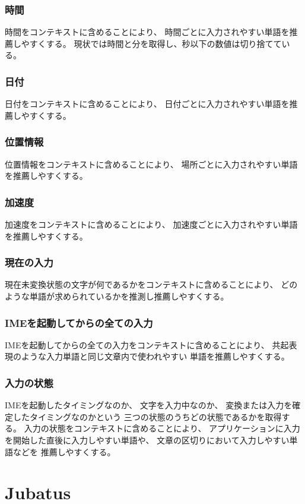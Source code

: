 \subsubsection{時間}
時間をコンテキストに含めることにより、
時間ごとに入力されやすい単語を推薦しやすくする。
現状では時間と分を取得し、秒以下の数値は切り捨てている。

\subsubsection{日付}
日付をコンテキストに含めることにより、
日付ごとに入力されやすい単語を推薦しやすくする。

\subsubsection{位置情報}
位置情報をコンテキストに含めることにより、
場所ごとに入力されやすい単語を推薦しやすくする。

\subsubsection{加速度}
加速度をコンテキストに含めることにより、
加速度ごとに入力されやすい単語を推薦しやすくする。

\subsubsection{現在の入力}
現在未変換状態の文字が何であるかをコンテキストに含めることにより、
どのような単語が求められているかを推測し推薦しやすくする。

\subsubsection{IMEを起動してからの全ての入力}
IMEを起動してからの全ての入力をコンテキストに含めることにより、
共起表現のような入力単語と同じ文章内で使われやすい
単語を推薦しやすくする。

\subsubsection{入力の状態}
IMEを起動したタイミングなのか、
文字を入力中なのか、
変換または入力を確定したタイミングなのかという
三つの状態のうちどの状態であるかを取得する。
入力の状態をコンテキストに含めることにより、
アプリケーションに入力を開始した直後に入力しやすい単語や、
文章の区切りにおいて入力しやすい単語などを
推薦しやすくする。

\section{Jubatus}
\label{sec:jubatus}

